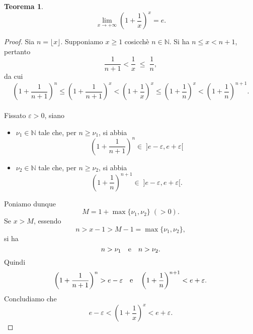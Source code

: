 \documentclass{article}
\theoremstyle{plain}
\newtheorem{thm}{Teorema}[section]
\theoremstyle{definition}
\theoremstyle{remark}
\begin{document}
\begin{center}
\end{center}

\vspace{10pt}

\begin{bxthm}
\begin{thm}
    \[\lim_{x\to+\infty}\left(1+\frac{1}{x}\right)^x=e.\]
\end{thm}
\end{bxthm}
\begin{proof}
    Sia $n=\lfloor x\rfloor$. Supponiamo $x\geq1$ cosicchè $n\in\mathbb{N}$.
    Si ha $n\leq x<n+1$, pertanto 
    \[\dfrac{1}{n+1}<\dfrac{1}{x}\;\leq\;\dfrac{1}{n},\] da cui
    \[\left(1+\frac{1}{n+1}\right)^n\leq\left(1+\frac{1}{n+1}\right)^x<\left(1+\frac{1}{x}\right)^x\leq\left(1+\frac{1}{n}\right)^x<\left(1+\frac{1}{n}\right)^{n+1}.\]\\
    Fissato $\varepsilon>0$, siano 
    \begin{itemize}
        \item $\nu_1\in\mathbb{N}$ tale che, per $n\geq\nu_1$, si abbia \[\left(1+\dfrac{1}{n+1}\right)^n\in\;]e-\varepsilon,e+\varepsilon[\]
        \item $\nu_2\in\mathbb{N}$ tale che, per $n\geq\nu_2$, si abbia \[\left(1+\dfrac{1}{n}\right)^{n+1}\in\;]e-\varepsilon,e+\varepsilon[.\]
    \end{itemize}
    Poniamo dunque \[M=1+\max\{\nu_1,\nu_2\}\;(>0).\]
    Se $x>M$, essendo 
    \[n>x-1>M-1=\max\{\nu_1,\nu_2\},\]si ha \[n>\nu_1\quad\textup{e}\quad n>\nu_2.\] 
    Quindi 
    \[\left(1+\frac{1}{n+1}\right)^n>e-\varepsilon\quad\textup{e}\quad\left(1+\frac{1}{n}\right)^{n+1}<e+\varepsilon.\]
    Concludiamo che \[e-\varepsilon<\left(1+\frac{1}{x}\right)^x<e+\varepsilon.\]
\end{proof}
\end{document}
